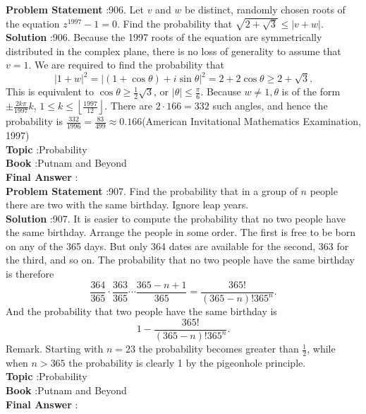 \documentclass[10pt]{article}
\begin{document}
\textbf{Problem Statement} :906. Let $v$ and $w$ be distinct, randomly chosen roots of the equation $z^{1997}-1=0$. Find the probability that $\sqrt{2+\sqrt{3}} \leq|v+w|$.\\
\textbf{Solution} :906. Because the 1997 roots of the equation are symmetrically distributed in the complex plane, there is no loss of generality to assume that $v=1$. We are required to find the probability that$$ |1+w|^{2}=|(1+\cos \theta)+i \sin \theta|^{2}=2+2 \cos \theta \geq 2+\sqrt{3} . $$This is equivalent to $\cos \theta \geq \frac{1}{2} \sqrt{3}$, or $|\theta| \leq \frac{\pi}{6}$. Because $w \neq 1, \theta$ is of the form $\pm \frac{2 k \pi}{1997} k$, $1 \leq k \leq\left\lfloor\frac{1997}{12}\right\rfloor$. There are $2 \cdot 166=332$ such angles, and hence the probability is $\frac{332}{1996}=\frac{83}{499} \approx 0.166$(American Invitational Mathematics Examination, 1997)\\
\textbf{Topic} :Probability\\
\textbf{Book} :Putnam and Beyond\\
\textbf{Final Answer} :\\


\textbf{Problem Statement} :907. Find the probability that in a group of $n$ people there are two with the same birthday. Ignore leap years.\\
\textbf{Solution} :907. It is easier to compute the probability that no two people have the same birthday. Arrange the people in some order. The first is free to be born on any of the 365 days. But only 364 dates are available for the second, 363 for the third, and so on. The probability that no two people have the same birthday is therefore$$ \frac{364}{365} \cdot \frac{363}{365} \cdots \frac{365-n+1}{365}=\frac{365 !}{(365-n) ! 365^{n}} . $$And the probability that two people have the same birthday is$$ 1-\frac{365 !}{(365-n) ! 365^{n}} . $$Remark. Starting with $n=23$ the probability becomes greater than $\frac{1}{2}$, while when $n>365$ the probability is clearly 1 by the pigeonhole principle. \\
\textbf{Topic} :Probability\\
\textbf{Book} :Putnam and Beyond\\
\textbf{Final Answer} :\\
\end{document}
